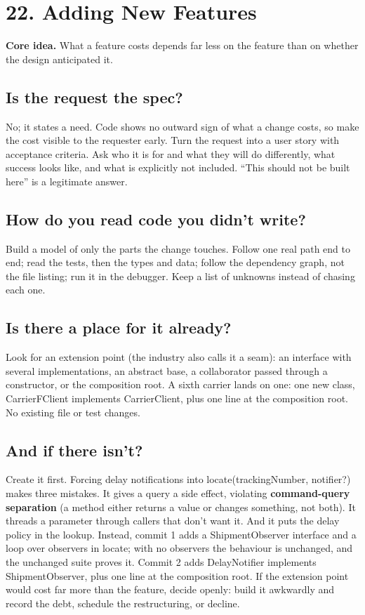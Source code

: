 \documentclass[10pt]{article}
\newcommand{\code}[1]{{\ttfamily\small #1}}
\newcommand{\marginnotestyle}{\scriptsize\sffamily\color{black!80}\RaggedRight}
\newcommand{\safemargin}[1]{%
  \ifinner%
  \else%
    \marginpar{\marginnotestyle #1}%
  \fi%
}
\newcommand{\term}[3][]{%
  \hypertarget{t:#2}{\textbf{#3}}%
  \if\relax\detokenize{#1}\relax\else%
    \safemargin{#1}%
  \fi%
}
\newcommand{\chap}[2]{\section*{#1}\addcontentsline{toc}{section}{#1}\vspace{-2pt}\begin{corebox}\textbf{Core idea.} #2\end{corebox}}
\begin{document}
\chap{22. Adding New Features}{What a feature costs depends far less on the feature than on whether the design anticipated it.}

\subsection{Is the request the spec?}
No; it states a need. Code shows no outward sign of what a change costs, so make the cost visible to the requester early. Turn the request into a user story with acceptance criteria. Ask who it is for and what they will do differently, what success looks like, and what is explicitly not included. ``This should not be built here'' is a legitimate answer.

\subsection{How do you read code you didn't write?}
Build a model of only the parts the change touches. Follow one real path end to end; read the tests, then the types and data; follow the dependency graph, not the file listing; run it in the debugger. Keep a list of unknowns instead of chasing each one.

\subsection{Is there a place for it already?}
Look for an extension point (the industry also calls it a seam): an interface with several implementations, an abstract base, a collaborator passed through a constructor, or the composition root. A sixth carrier lands on one: one new class, \code{CarrierFClient implements CarrierClient}, plus one line at the composition root. No existing file or test changes.

\subsection{And if there isn't?}
Create it first. Forcing delay notifications into \code{locate(trackingNumber, notifier?)} makes three mistakes. It gives a query a side effect, violating \term{cqs}{command-query separation} (a method either returns a value or changes something, not both). It threads a parameter through callers that don't want it. And it puts the delay policy in the lookup. Instead, commit 1 adds a \code{ShipmentObserver} interface and a loop over observers in \code{locate}; with no observers the behaviour is unchanged, and the unchanged suite proves it. Commit 2 adds \code{DelayNotifier implements ShipmentObserver}, plus one line at the composition root. If the extension point would cost far more than the feature, decide openly: build it awkwardly and record the debt, schedule the restructuring, or decline.
\end{document}
